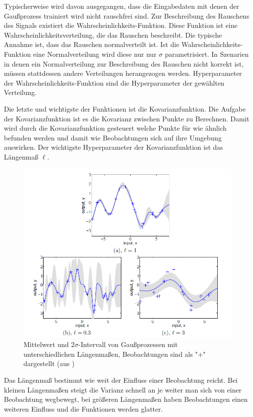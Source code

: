 Typischerweise wird davon ausgegangen, dass die Eingabedaten mit denen der Gaußprozess trainiert wird nicht rauschfrei sind.
Zur Beschreibung des Rauschens des Signals existiert die Wahrscheinlichkeits-Funktion.
Diese Funktion ist eine Wahrscheinlichkeitsverteilung, die das Rauschen beschreibt.
Die typische Annahme ist, dass das Rauschen normalverteilt ist.
Ist die Wahrscheinlichkeits-Funktion eine Normalverteilung wird diese nur nur $\sigma$ parametrisiert.
In Szenarien in denen ein Normalverteilung zur Beschreibung des Rauschen nicht korrekt ist, müssen stattdessen andere Verteilungen herangezogen werden.
Hyperparameter der Wahrscheinlichkeits-Funktion sind die Hyperparameter der gewählten Verteilung.

Die letzte und wichtigste der Funktionen ist die Kovarianzfunktion.
Die Aufgabe der Kovarianzfunktion ist es die Kovarianz zwischen Punkte zu Berechnen.
Damit wird durch die Kovarianzfunktion gesteuert welche Punkte für wie ähnlich befunden werden und damit wie Beobachtungen sich auf ihre Umgebung auswirken.
Der wichtigste Hyperparameter der Kovarianzfunktion ist das Längenmaß $\ell$.
\begin{figure}[h]
	\centering
	\includegraphics[width=1\linewidth]{bilder/lengthscale}
	\caption{Mittelwert und $2\sigma$-Intervall von Gaußprozessen mit unterschiedlichen Längenmaßen, Beobachtungen sind als "+" dargestellt (aus \cite{Rasmussen.2008})}
	\label{fig:lengthscale}
\end{figure}
Das Längenmaß bestimmt wie weit der Einfluss einer Beobachtung reicht.
Bei kleinen Längenmaßen steigt die Varianz schnell an je weiter man sich von einer Beobachtung wegbewegt, bei größeren Längenmaßen haben Beobachtungen einen weiteren Einfluss und die Funktionen werden glatter.
